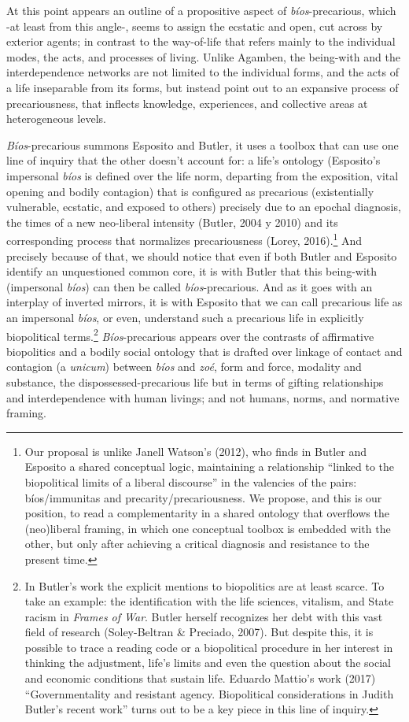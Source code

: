 \documentclass[a4paper,]{scrartcl}
\begin{document}
At this point appears an outline of a propositive aspect of
\emph{bíos}-precarious, which -at least from this angle-, seems to
assign the ecstatic and open, cut across by exterior agents; in contrast
to the way-of-life that refers mainly to the individual modes, the acts,
and processes of living. Unlike Agamben, the being-with and the
interdependence networks are not limited to the individual forms, and
the acts of a life inseparable from its forms, but instead point out to
an expansive process of precariousness, that inflects knowledge,
experiences, and collective areas at heterogeneous levels.

\emph{Bíos}-precarious summons Esposito and Butler, it uses a toolbox
that can use one line of inquiry that the other doesn't account for: a
life's ontology (Esposito's impersonal \emph{bíos} is defined over the
life norm, departing from the exposition, vital opening and bodily
contagion) that is configured as precarious (existentially vulnerable,
ecstatic, and exposed to others) precisely due to an epochal diagnosis,
the times of a new neo-liberal intensity (Butler, 2004 y 2010) and its
corresponding process that normalizes precariousness (Lorey,
2016).\footnote{Our proposal is unlike Janell Watson's (2012), who finds
  in Butler and Esposito a shared conceptual logic, maintaining a
  relationship ``linked to the biopolitical limits of a liberal
  discourse'' in the valencies of the pairs: bíos/immunitas and
  precarity/precariousness. We propose, and this is our position, to
  read a complementarity in a shared ontology that overflows the
  (neo)liberal framing, in which one conceptual toolbox is embedded with
  the other, but only after achieving a critical diagnosis and
  resistance to the present time.} And precisely because of that, we
should notice that even if both Butler and Esposito identify an
unquestioned common core, it is with Butler that this being-with
(impersonal \emph{bíos}) can then be called \emph{bíos}-precarious. And
as it goes with an interplay of inverted mirrors, it is with Esposito
that we can call precarious life as an impersonal \emph{bíos}, or even,
understand such a precarious life in explicitly biopolitical
terms.\footnote{In Butler's work the explicit mentions to biopolitics
  are at least scarce. To take an example: the identification with the
  life sciences, vitalism, and State racism in \emph{Frames of War}.
  Butler herself recognizes her debt with this vast field of research
  (Soley-Beltran \& Preciado, 2007). But despite this, it is possible to
  trace a reading code or a biopolitical procedure in her interest in
  thinking the adjustment, life's limits and even the question about the
  social and economic conditions that sustain life. Eduardo Mattio's
  work (2017) ``Governmentality and resistant agency. Biopolitical
  considerations in Judith Butler's recent work'' turns out to be a key
  piece in this line of inquiry.} \emph{Bíos}-precarious appears over
the contrasts of affirmative biopolitics and a bodily social ontology
that is drafted over linkage of contact and contagion (a \emph{unicum})
between \emph{bíos} and \emph{zoé}, form and force, modality and
substance, the dispossessed-precarious life but in terms of gifting
relationships and interdependence with human livings; and not humans,
norms, and normative framing.
\end{document}
